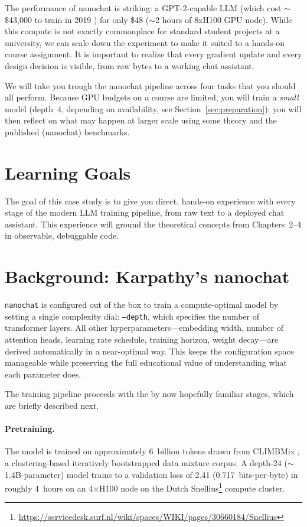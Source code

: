 The performance of nanochat is striking: a GPT-2-capable LLM (which cost $\sim$\$43,000 to train in 2019 \citep{radford2019language}) for only \$48 ($\sim$2 hours of 8xH100 GPU node). While this compute is not exactly commonplace for standard student projects at a university, we can scale down the experiment to make it suited to a hands-on course assignment. It is important to realize that every gradient update and every design decision is visible, from raw bytes to a working chat assistant.

We will take you trough the nanochat pipeline across four tasks that you should all perform. Because GPU budgets on a course are limited, you will train a \emph{small} model (depth~4, depending on availability, see Section~\ref{sec:preparation}); you will then reflect on what may happen at larger scale using some theory and the published (nanochat) benchmarks.

\section{Learning Goals}
\label{sec:learning-goals}

The goal of this case study is to give you direct, hands-on experience with every stage of the modern LLM training pipeline, from raw text to a deployed chat assistant. This experience will ground the theoretical concepts from Chapters~2--4 in observable, debuggable code.

\section{Background: Karpathy's nanochat}
\label{sec:background}

\texttt{nanochat} is configured out of the box to train a compute-optimal model by setting a single complexity dial: \texttt{--depth}, which specifies the number of transformer layers. All other hyperparameters---embedding width, number of attention heads, learning rate schedule, training horizon, weight decay---are derived automatically in a near-optimal way. This keeps the configuration space manageable while preserving the full educational value of understanding what each parameter does.

The training pipeline proceeds with the by now hopefully familiar stages, which are briefly described next.

\paragraph{Pretraining.}  The model is trained on approximately 6~billion tokens drawn from CLIMBMix \citep{diao2025nemotronclimb}, a clustering-based iteratively bootstrapped data mixture corpus.  A depth-24 ($\sim $1.4B-parameter) model trains to a validation loss of 2.41 (0.717~bits-per-byte) in roughly 4~hours on an 4$\times$H100 node on the Dutch Snellius\footnote{\url{https://servicedesk.surf.nl/wiki/spaces/WIKI/pages/30660184/Snellius}} compute cluster.

